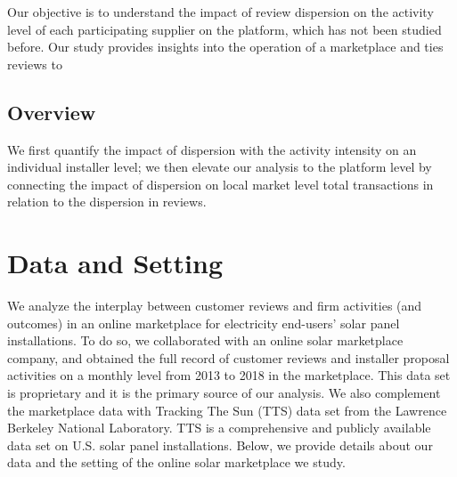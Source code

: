 \documentclass[msom,blindrev]{informs3}
\begin{document}
Our objective is to understand the impact of review dispersion on the activity level of each participating supplier on the platform, which has not been studied before. Our study provides insights into the operation of a marketplace and ties reviews to






\subsection{Overview}

We first quantify the impact of dispersion with the activity intensity on an individual installer level; we then elevate our analysis to the platform level by connecting the impact of dispersion on local market level total transactions in relation to the dispersion in reviews.


\section{Data and Setting}

We analyze the interplay between customer reviews and firm activities (and outcomes) in an online marketplace for electricity end-users' solar panel installations. To do so, we collaborated with an online solar marketplace company, and obtained the full record of customer reviews and installer proposal activities on a monthly level from 2013 to 2018 in the marketplace. This data set is proprietary and it is the primary source of our analysis. We also complement the marketplace data with Tracking The Sun (TTS) data set from the Lawrence Berkeley National Laboratory. TTS is a comprehensive and publicly available data set on U.S. solar panel installations. Below, we provide details about our data and the setting of the online solar marketplace we study.


\end{document}
